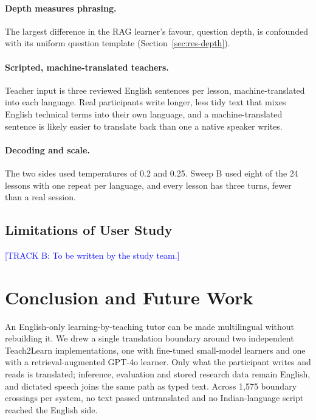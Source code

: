 \documentclass[pdflatex,sn-mathphys-num]{sn-jnl}%
\newcommand{\trackb}[1]{\textcolor{blue}{[TRACK B: #1]}}
\theoremstyle{thmstyleone}%
\theoremstyle{thmstyletwo}%
\theoremstyle{thmstylethree}%
\begin{document}
\paragraph{Depth measures phrasing.} The largest difference in the RAG learner's favour, question
depth, is confounded with its uniform question template (Section~\ref{sec:res-depth}).

\paragraph{Scripted, machine-translated teachers.} Teacher input is three reviewed English sentences
per lesson, machine-translated into each language. Real participants write longer, less tidy text
that mixes English technical terms into their own language, and a machine-translated sentence is
likely easier to translate back than one a native speaker writes.

\paragraph{Decoding and scale.} The two sides used temperatures of 0.2 and 0.25. Sweep B used eight of
the 24 lessons with one repeat per language, and every lesson has three turns, fewer than a real
session.

\subsection{Limitations of User Study}\label{sec:lim-study}

\trackb{To be written by the study team.}

\section{Conclusion and Future Work}\label{sec:conclusion}

An English-only learning-by-teaching tutor can be made multilingual without rebuilding it. We drew a
single translation boundary around two independent Teach2Learn implementations, one with fine-tuned
small-model learners and one with a retrieval-augmented GPT-4o learner. Only what the participant
writes and reads is translated; inference, evaluation and stored research data remain English, and
dictated speech joins the same path as typed text. Across 1,575 boundary crossings per system, no text
passed untranslated and no Indian-language script reached the English side.
\end{document}
